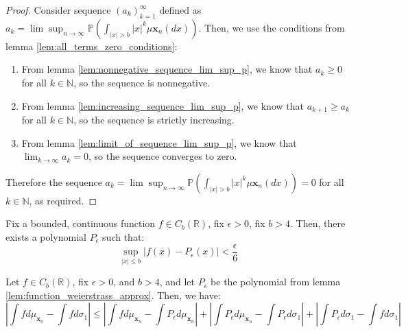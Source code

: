 \begin{proof}
    Consider sequence $(a_{k})_{k =1}^{\infty}$ defined as $a_{k} = \lim \sup_{n\to\infty}\mathbb{P}(\int_{|x| > b}|x|^{k} \mu\mathbf{x}_{n}(dx))$. Then, we use the conditions from lemma \ref{lem:all_terms_zero_conditions}:
    \begin{enumerate}
        \item From lemma \ref{lem:nonnegative_sequence_lim_sup_p}, we know that $a_{k} \geq 0$ for all $k \in \mathbb{N}$, so the sequence is nonnegative.
        \item From lemma \ref{lem:increasing_sequence_lim_sup_p}, we know that $a_{k+1} \geq a_{k}$ for all $k \in \mathbb{N}$, so the sequence is strictly increasing.
        \item From lemma \ref{lem:limit_of_sequence_lim_sup_p}, we know that $\lim_{k\to\infty} a_{k} = 0$, so the sequence converges to zero.
    \end{enumerate}
    Therefore the sequence $a_{k} = \lim \sup_{n\to\infty}\mathbb{P}(\int_{|x| > b}|x|^{k} \mu\mathbf{x}_{n}(dx)) = 0$ for all $k \in \mathbb{N}$, as required.
\end{proof}

\begin{lemma}
    \label{lem:function_weierstrass_approx}
    \notready
    Fix a bounded, continuous function $f \in C_{b}(\mathbb{R})$, fix $\epsilon > 0$, fix $b > 4$. Then, there exists a polynomial  $P_{\epsilon}$ such that:
    $$
    \sup_{|x| \leq b} |f(x) - P_{\epsilon}(x)| < \frac{\epsilon}{6}
    $$ 
\end{lemma}

\begin{lemma}
    \label{lem:estimates_from_triangle_inequality}
    \notready
    Let $f \in C_{b}(\mathbb{R})$, fix $\epsilon > 0$, and  $b > 4$, and let  $P_{\epsilon}$ be the polynomial from lemma \ref{lem:function_weierstrass_approx}. Then, we have:
    $$
    \left|\int f d\mu_{\mathbf{x}_{n}} - \int f d\sigma_{1}\right| \leq \left|\int f d\mu_{\mathbf{x}_{n}} - \int P_{\epsilon} d\mu_{\mathbf{x}_{n}}\right| + \left|\int P_{\epsilon} d\mu_{\mathbf{x}_{n}} - \int P_{\epsilon} d\sigma_{1}\right| + \left|\int P_{\epsilon} d\sigma_1 - \int f d\sigma_1\right|
    $$ 
\end{lemma}
